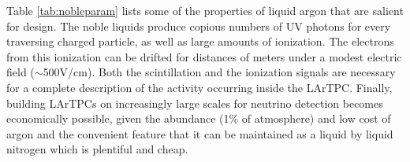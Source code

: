 Table \ref{tab:nobleparam} lists some of the properties of liquid argon that are salient for \lartpc design.  
The noble liquids produce copious numbers of UV photons for every traversing charged particle, as well as large amounts of ionization.  The electrons from this ionization can be drifted for distances of meters under a modest electric field ($\sim$500V/cm).   Both the scintillation and the ionization signals are necessary for a complete description of the activity occurring inside the LArTPC.  Finally, building LArTPCs on increasingly large scales for neutrino detection becomes economically possible, given the abundance (1\% of atmosphere) and low cost of argon and the convenient feature that it can be maintained as a liquid by liquid nitrogen which is plentiful and cheap.    

